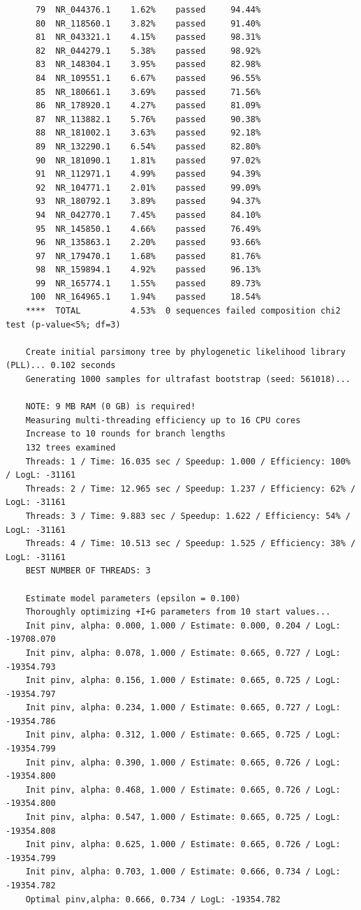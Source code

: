 \documentclass{article}
\begin{document}
\begin{verbatim}
      79  NR_044376.1    1.62%    passed     94.44%
      80  NR_118560.1    3.82%    passed     91.40%
      81  NR_043321.1    4.15%    passed     98.31%
      82  NR_044279.1    5.38%    passed     98.92%
      83  NR_148304.1    3.95%    passed     82.98%
      84  NR_109551.1    6.67%    passed     96.55%
      85  NR_180661.1    3.69%    passed     71.56%
      86  NR_178920.1    4.27%    passed     81.09%
      87  NR_113882.1    5.76%    passed     90.38%
      88  NR_181002.1    3.63%    passed     92.18%
      89  NR_132290.1    6.54%    passed     82.80%
      90  NR_181090.1    1.81%    passed     97.02%
      91  NR_112971.1    4.99%    passed     94.39%
      92  NR_104771.1    2.01%    passed     99.09%
      93  NR_180792.1    3.89%    passed     94.37%
      94  NR_042770.1    7.45%    passed     84.10%
      95  NR_145850.1    4.66%    passed     76.49%
      96  NR_135863.1    2.20%    passed     93.66%
      97  NR_179470.1    1.68%    passed     81.76%
      98  NR_159894.1    4.92%    passed     96.13%
      99  NR_165774.1    1.55%    passed     89.73%
     100  NR_164965.1    1.94%    passed     18.54%
    ****  TOTAL          4.53%  0 sequences failed composition chi2 test (p-value<5%; df=3)
    
    Create initial parsimony tree by phylogenetic likelihood library (PLL)... 0.102 seconds
    Generating 1000 samples for ultrafast bootstrap (seed: 561018)...
    
    NOTE: 9 MB RAM (0 GB) is required!
    Measuring multi-threading efficiency up to 16 CPU cores
    Increase to 10 rounds for branch lengths
    132 trees examined
    Threads: 1 / Time: 16.035 sec / Speedup: 1.000 / Efficiency: 100% / LogL: -31161
    Threads: 2 / Time: 12.965 sec / Speedup: 1.237 / Efficiency: 62% / LogL: -31161
    Threads: 3 / Time: 9.883 sec / Speedup: 1.622 / Efficiency: 54% / LogL: -31161
    Threads: 4 / Time: 10.513 sec / Speedup: 1.525 / Efficiency: 38% / LogL: -31161
    BEST NUMBER OF THREADS: 3
    
    Estimate model parameters (epsilon = 0.100)
    Thoroughly optimizing +I+G parameters from 10 start values...
    Init pinv, alpha: 0.000, 1.000 / Estimate: 0.000, 0.204 / LogL: -19708.070
    Init pinv, alpha: 0.078, 1.000 / Estimate: 0.665, 0.727 / LogL: -19354.793
    Init pinv, alpha: 0.156, 1.000 / Estimate: 0.665, 0.725 / LogL: -19354.797
    Init pinv, alpha: 0.234, 1.000 / Estimate: 0.665, 0.727 / LogL: -19354.786
    Init pinv, alpha: 0.312, 1.000 / Estimate: 0.665, 0.725 / LogL: -19354.799
    Init pinv, alpha: 0.390, 1.000 / Estimate: 0.665, 0.726 / LogL: -19354.800
    Init pinv, alpha: 0.468, 1.000 / Estimate: 0.665, 0.726 / LogL: -19354.800
    Init pinv, alpha: 0.547, 1.000 / Estimate: 0.665, 0.725 / LogL: -19354.808
    Init pinv, alpha: 0.625, 1.000 / Estimate: 0.665, 0.726 / LogL: -19354.799
    Init pinv, alpha: 0.703, 1.000 / Estimate: 0.666, 0.734 / LogL: -19354.782
    Optimal pinv,alpha: 0.666, 0.734 / LogL: -19354.782
    

\end{verbatim}
\end{document}
